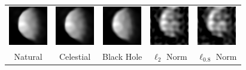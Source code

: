 \begin{figure}[b]
\begin{center}
\begin{tabular}{c c c c c}
 			
 			 			\includegraphics[width=.19\linewidth]
 			 			{celestial_14_chirp_1.png} & 	\hspace{-.17in} \includegraphics[width=.19\linewidth]
 			 			{celestial_14_celestial.png} & 	\hspace{-.17in}
 			 			\includegraphics[width=.19\linewidth]
 			 			{celestial_14_blackhole.png}& 	\hspace{-.17in}
 			 			\includegraphics[width=.19\linewidth]
 			 			{celestial14_l2.png}& 	\hspace{-.17in} 
 			 			\includegraphics[width=.19\linewidth]
 			 			{celestial14_l08.png} \\
 			
 			\small{\textsf{Natural}}  & \hspace{-.17in} \small{\textsf{Celestial}}  & \hspace{-.17in}
 			\small{\textsf{Black Hole}}  & \hspace{-.17in} \small{\textsf{$\ell_2$ Norm}}  & \hspace{-.17in} \small{\textsf{$\ell_{0.8}$ Norm}} \\
 			

\end{tabular}
\end{center}
\end{figure}
